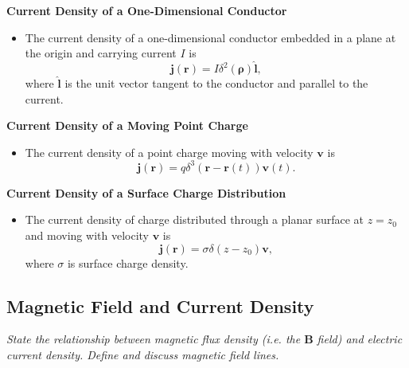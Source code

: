 \documentclass[11pt, a4paper]{article}
\renewcommand{\vec}[1]{\bm{#1}} %
\newcommand{\uvec}[1]{\hat{\vec{#1}}} %
\renewcommand{\r}{\vec{r}}
\newcommand{\B}{\vec{B}} %
\renewcommand{\j}{\vec{j}}  %
\begin{document}
\textbf{Current Density of a One-Dimensional Conductor}
\begin{itemize}
	\item The current density of a one-dimensional conductor embedded in a plane at the origin and carrying current $ I $ is
	\begin{equation*}
		\j(\r) = I \delta^{2}(\vec{\rho}) \uvec{l},
	\end{equation*}
	where $ \uvec{l} $ is the unit vector tangent to the conductor and parallel to the current.
\end{itemize}

\textbf{Current Density of a Moving Point Charge}
\begin{itemize}
	\item The current density of a point charge moving with velocity $ \vec{v} $ is
	\begin{equation*}
		\j(\r) = q \delta^{3}(\r - \r(t))\vec{v}(t).
	\end{equation*}
\end{itemize}
	
\textbf{Current Density of a Surface Charge Distribution}
\begin{itemize}
    \item The current density of charge distributed through a planar surface at $ z = z_{0} $ and moving with velocity $ \vec{v} $ is
	\begin{equation*}
		\j(\r) = \sigma \delta (z - z_{0})\vec{v},
	\end{equation*}
	where $ \sigma $ is surface charge density. 
	
\end{itemize}

\subsection{Magnetic Field and Current Density}
\textit{State the relationship between magnetic flux density (i.e. the $ \B $ field) and electric current density. Define and discuss magnetic field lines.}
\end{document}

